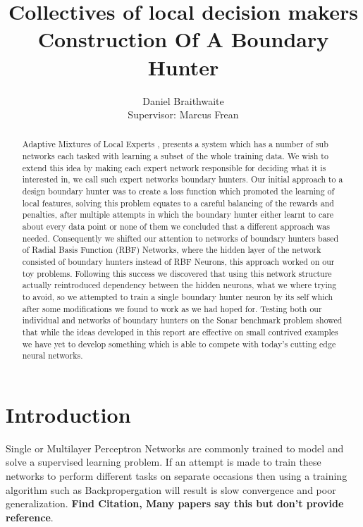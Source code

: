 \documentclass[notitlepage]{report}
\title{%
	Collectives of local decision makers\\
	\large Construction Of A Boundary Hunter
}
\author{Daniel Braithwaite\\[1cm] {Supervisor: Marcus Frean}}
\theoremstyle{definition}
\begin{document}
\begin{titlingpage}
    \maketitle
    \begin{abstract}
    Adaptive Mixtures of Local Experts \cite{jacobs1991adaptive}, presents a system which has a number of sub networks each tasked with learning a subset of the whole training data. We wish to extend this idea by making each expert network responsible for deciding what it is interested in, we call such expert networks boundary hunters. Our initial approach to a design boundary hunter was to create a loss function which promoted the learning of local features, solving this problem equates to a careful balancing of the rewards and penalties, after multiple attempts in which the boundary hunter either learnt to care about every data point or none of them we concluded that a different approach was needed. Consequently we shifted our attention to networks of boundary hunters based of Radial Basis Function (RBF) Networks, where the hidden layer of the network consisted of boundary hunters instead of RBF Neurons, this approach worked on our toy problems. Following this success we discovered that using this network structure actually reintroduced dependency between the hidden neurons, what we where trying to avoid, so we attempted to train a single boundary hunter neuron by its self which after some modifications we found to work as we had hoped for. Testing both our individual and networks of boundary hunters on the Sonar benchmark problem showed that while the ideas developed in this report are effective on small contrived examples we have yet to develop something which is able to compete with today's cutting edge neural networks.
    \end{abstract}
\end{titlingpage}

\chapter{Introduction}

Single or Multilayer Perceptron Networks are commonly trained to model and solve a supervised learning problem. If an attempt is made to train these networks to perform different tasks on separate occasions then using a training algorithm such as Backpropergation will result is slow convergence and poor generalization. \textbf{Find Citation, Many papers say this but don't provide reference}.\\
\end{document}
